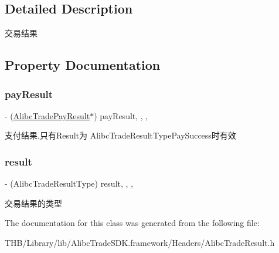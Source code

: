 \subsection{Detailed Description}
交易结果 

\subsection{Property Documentation}
\mbox{\label{interface_alibc_trade_result_a83f2192474fa3faa0401f7b160f777a3}} 
\subsubsection{\texorpdfstring{pay\+Result}{payResult}}
{\footnotesize\ttfamily -\/ (\mbox{\hyperlink{interface_alibc_trade_pay_result}{Alibc\+Trade\+Pay\+Result}}$\ast$) pay\+Result\hspace{0.3cm}{\ttfamily [read]}, {\ttfamily [write]}, {\ttfamily [nonatomic]}, {\ttfamily [strong]}}

支付结果,只有\+Result为 Alibc\+Trade\+Result\+Type\+Pay\+Success时有效 \mbox{\label{interface_alibc_trade_result_a8c932a7e31aa178d212f59994ef5fd66}} 
\subsubsection{\texorpdfstring{result}{result}}
{\footnotesize\ttfamily -\/ (Alibc\+Trade\+Result\+Type) result\hspace{0.3cm}{\ttfamily [read]}, {\ttfamily [write]}, {\ttfamily [nonatomic]}, {\ttfamily [assign]}}

交易结果的类型 

The documentation for this class was generated from the following file\+:\begin{DoxyCompactItemize}
\item 
T\+H\+B/\+Library/lib/\+Alibc\+Trade\+S\+D\+K.\+framework/\+Headers/Alibc\+Trade\+Result.\+h\end{DoxyCompactItemize}
